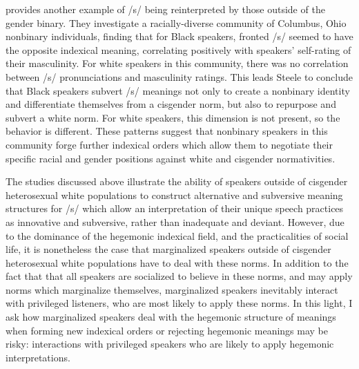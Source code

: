\documentclass[12pt,twoside]{reedthesis}
\begin{document}
\textcite{steele_enacting_2022} provides another example of /s/ being reinterpreted by those outside of the gender binary. They investigate a racially-diverse community of Columbus, Ohio nonbinary individuals, finding that for Black speakers, fronted /s/ seemed to have the opposite indexical meaning, correlating positively with speakers' self-rating of their masculinity. For white speakers in this community, there was no correlation between /s/ pronunciations and masculinity ratings. This leads Steele to conclude that Black speakers subvert /s/ meanings not only to create a nonbinary identity and differentiate themselves from a cisgender norm, but also to repurpose and subvert a white norm. For white speakers, this dimension is not present, so the behavior is different. These patterns suggest that nonbinary speakers in this community forge further indexical orders which allow them to negotiate their specific racial and gender positions against white and cisgender normativities. %

The studies discussed above illustrate the ability of speakers outside of cisgender heterosexual white populations to construct alternative and subversive meaning structures for /s/ which allow an interpretation of their unique speech practices as innovative and subversive, rather than inadequate and deviant. However, due to the dominance of the hegemonic indexical field, and the practicalities of social life, it is nonetheless the case that marginalized speakers outside of cisgender heterosexual white populations have to deal with these norms. In addition to the fact that that all speakers are socialized to believe in these norms, and may apply norms which marginalize themselves, marginalized speakers inevitably interact with privileged listeners, who are most likely to apply these norms. In this light, I ask how marginalized speakers deal with the hegemonic structure of meanings when forming new indexical orders or rejecting hegemonic meanings may be risky: interactions with privileged speakers who are likely to apply hegemonic interpretations.
\end{document}
